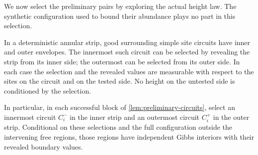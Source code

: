 We now select the preliminary pairs by exploring the actual height law.
The synthetic configuration used to bound their abundance plays no part
in this selection.

\begin{lemma}\label{lem:extremal-stopping}
In a deterministic annular strip, good surrounding simple site circuits
have inner and outer envelopes.  The innermost such circuit can be selected
by revealing the strip from its inner side; the outermost can be selected
from its outer side.  In each case the selection and the revealed values
are measurable with respect to the sites on the circuit and on the tested
side.  No height on the untested side is conditioned by the selection.

In particular, in each successful block of
\cref{lem:preliminary-circuits}, select an innermost circuit $C_i^-$ in the
inner strip and an outermost circuit $C_i^+$ in the outer strip.  Conditional
on these selections and the full configuration outside the intervening free
regions, those regions have independent Gibbs interiors with their
revealed boundary values.
\end{lemma}

